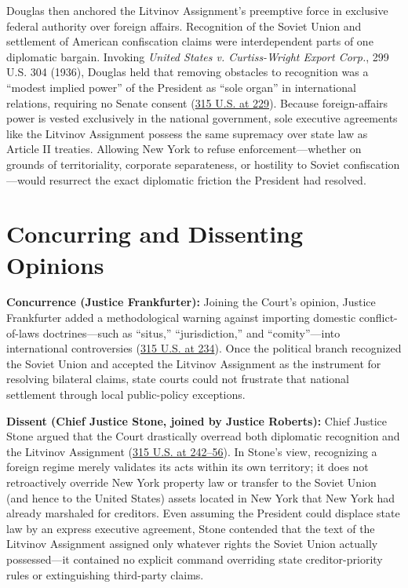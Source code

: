 \documentclass[12pt]{article}
\begin{document}
Douglas then anchored the Litvinov Assignment's preemptive force in exclusive federal authority over foreign affairs. Recognition of the Soviet Union and settlement of American confiscation claims were interdependent parts of one diplomatic bargain. Invoking \textit{United States v. Curtiss-Wright Export Corp.}, 299 U.S. 304 (1936), Douglas held that removing obstacles to recognition was a ``modest implied power'' of the President as ``sole organ'' in international relations, requiring no Senate consent (\href{https://www.law.cornell.edu/supremecourt/text/315/203}{315 U.S. at 229}). Because foreign-affairs power is vested exclusively in the national government, sole executive agreements like the Litvinov Assignment possess the same supremacy over state law as Article II treaties. Allowing New York to refuse enforcement---whether on grounds of territoriality, corporate separateness, or hostility to Soviet confiscation---would resurrect the exact diplomatic friction the President had resolved.

\section{Concurring and Dissenting Opinions}
\textbf{Concurrence (Justice Frankfurter):} Joining the Court's opinion, Justice Frankfurter added a methodological warning against importing domestic conflict-of-laws doctrines---such as ``situs,'' ``jurisdiction,'' and ``comity''---into international controversies (\href{https://caselaw.findlaw.com/court/us-supreme-court/315/203.html}{315 U.S. at 234}). Once the political branch recognized the Soviet Union and accepted the Litvinov Assignment as the instrument for resolving bilateral claims, state courts could not frustrate that national settlement through local public-policy exceptions.

\textbf{Dissent (Chief Justice Stone, joined by Justice Roberts):} Chief Justice Stone argued that the Court drastically overread both diplomatic recognition and the Litvinov Assignment (\href{https://supreme.justia.com/cases/federal/us/315/203/}{315 U.S. at 242--56}). In Stone's view, recognizing a foreign regime merely validates its acts within its own territory; it does not retroactively override New York property law or transfer to the Soviet Union (and hence to the United States) assets located in New York that New York had already marshaled for creditors. Even assuming the President could displace state law by an express executive agreement, Stone contended that the text of the Litvinov Assignment assigned only whatever rights the Soviet Union actually possessed---it contained no explicit command overriding state creditor-priority rules or extinguishing third-party claims.
\end{document}
